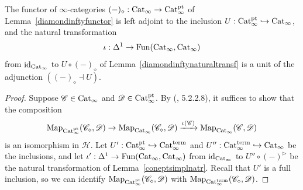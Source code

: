 \documentclass{tac}
\newcommand{\s}[1]{\mathscr{#1}}
\newcommand{\tx}[1]{\textnormal{#1}}
\begin{document}
\begin{theorem}\label{diamondisfreezerothm} The functor of $\infty$-categories $(-)_\diamond : \tx{Cat}_\infty \to \tx{Cat}_\infty^\tx{pt}$ of Lemma~\ref{diamondinftyfunctor} is left adjoint to the inclusion $U : \tx{Cat}_\infty^\tx{pt} \hookrightarrow  \tx{Cat}_\infty$, and the natural transformation \[\iota : \Delta^1 \to \tx{Fun}(\tx{Cat}_\infty , \tx{Cat}_\infty)\] from $\tx{id}_{\tx{Cat}_\infty}$ to $U\circ (-)_\diamond$ of Lemma~\ref{diamondinftynaturaltransf} is a unit of the adjunction $((-)_\diamond \dashv U)$.
\end{theorem}
\begin{proof} Suppose $\s{C}\in \tx{Cat}_\infty$ and $\s{D} \in  \tx{Cat}_\infty^{\tx{pt}}$.  By (\cite{htt}, 5.2.2.8), it suffices to show that the composition
\begin{equation}\label{diamondisfreezerothmcomp} \tx{Map}_{ \tx{Cat}_\infty^{\tx{pt}}} (\s{C}_\diamond , \s{D}) \to \tx{Map}_{ \tx{Cat}_\infty} (\s{C}_\diamond , \s{D}) \xrightarrow{\iota (\s{C})}  \tx{Map}_{ \tx{Cat}_\infty} (\s{C}, \s{D})\end{equation}
is an isomorphism in $\s{H}$.  Let $U' : \tx{Cat}_\infty^\tx{pt} \hookrightarrow  \tx{Cat}_\infty^\tx{term}$ and $U'' : \tx{Cat}_\infty^\tx{term} \hookrightarrow  \tx{Cat}_\infty$ be the inclusions, and let $\iota' : \Delta^1 \to \tx{Fun}(\tx{Cat}_\infty , \tx{Cat}_\infty )$ from $\tx{id}_{\tx{Cat}_\infty}$ to $U'' \circ (-)^\triangleright$ be the natural transformation of Lemma~\ref{coneptsimplnatr}.  Recall that $U'$ is a full inclusion, so we can identify $\tx{Map}_{\tx{Cat}_\infty^\tx{pt}} (\s{C}_\diamond , \s{D})$ with $\tx{Map}_{\tx{Cat}_\infty^\tx{term}} (\s{C}_\diamond , \s{D})$.


\end{proof}
\end{document}
